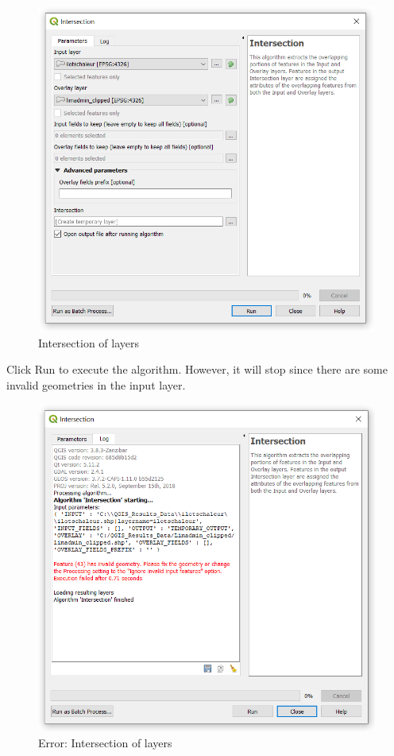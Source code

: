 \documentclass[]{book}
\theoremstyle{definition}
\theoremstyle{definition}
\theoremstyle{definition}
\theoremstyle{remark}
\begin{document}
\begin{figure}

{\centering \includegraphics[width=10.64in]{figures/Intersection_UHA} 

}

\caption{Intersection of layers}\label{fig:unnamed-chunk-28}
\end{figure}

Click Run to execute the algorithm. However, it will stop since there
are some invalid geometries in the input layer.

\begin{figure}

{\centering \includegraphics{figures/Intersection_UHA_Error.PNG } 

}

\caption{Error: Intersection of layers}\label{fig:unnamed-chunk-29}
\end{figure}
\end{document}
